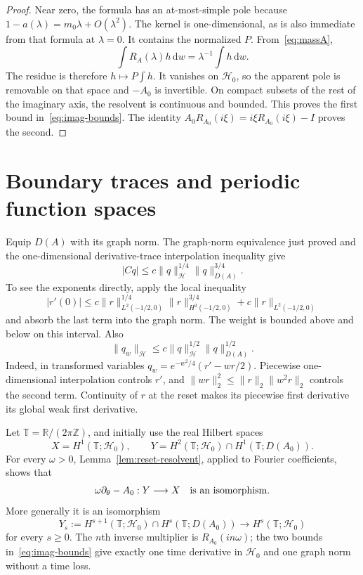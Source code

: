 \documentclass[11pt,a4paper]{article}
\numberwithin{equation}{section}
\theoremstyle{remark}\newtheorem{remark}[theorem]{Remark}
\newcommand{\R}{\mathbb R}\newcommand{\C}{\mathbb C}\newcommand{\T}{\mathbb T}
\newcommand{\HH}{\mathcal H}\newcommand{\DD}{\mathcal D}
\newcommand{\dd}{\,\mathrm d}
\begin{document}
\begin{proof}
Near zero, the formula has an at-most-simple pole because $1-a(\lambda)=m_0\lambda+O(\lambda^2)$. The kernel is one-dimensional, as is also immediate from that formula at $\lambda=0$. It contains the normalized $P$. From~\eqref{eq:massA},
\[
 \int R_A(\lambda)h\dd w=\lambda^{-1}\int h\dd w.
\]
The residue is therefore $h\mapsto P\int h$. It vanishes on $\HH_0$, so the apparent pole is removable on that space and $-A_0$ is invertible. On compact subsets of the rest of the imaginary axis, the resolvent is continuous and bounded. This proves the first bound in~\eqref{eq:imag-bounds}. The identity $A_0R_{A_0}(i\xi)=i\xi R_{A_0}(i\xi)-I$ proves the second.
\end{proof}

\section{Boundary traces and periodic function spaces}
Equip $D(A)$ with its graph norm. The graph-norm equivalence just proved and the one-dimensional derivative-trace interpolation inequality give
\begin{equation}\label{eq:trace-interpolation}
 |Cq|\leq c\|q\|_\HH^{1/4}\|q\|_{D(A)}^{3/4}.
\end{equation}
To see the exponents directly, apply the local inequality
\[
 |r'(0)|\leq c\|r\|_{L^2(-1/2,0)}^{1/4}
                  \|r\|_{H^2(-1/2,0)}^{3/4}
             +c\|r\|_{L^2(-1/2,0)}
\]
and absorb the last term into the graph norm. The weight is bounded above and below on this interval. Also
\begin{equation}\label{eq:derivative-interpolation}
 \|q_w\|_\HH\leq
 c\|q\|_\HH^{1/2}\|q\|_{D(A)}^{1/2}.
\end{equation}
Indeed, in transformed variables $q_w=e^{-w^2/4}(r'-wr/2)$. Piecewise one-dimensional interpolation controls $r'$, and
$\|wr\|_2^2\leq\|r\|_2\|w^2r\|_2$ controls the second term. Continuity of $r$ at the reset makes its piecewise first derivative its global weak first derivative.

Let $\T=\R/(2\pi\mathbb Z)$, and initially use the real Hilbert spaces
\begin{equation}\label{eq:XY}
 X=H^1(\T;\HH_0),\qquad
 Y=H^2(\T;\HH_0)\cap H^1(\T;D(A_0)).
\end{equation}
For every $\omega>0$, Lemma~\ref{lem:reset-resolvent}, applied to Fourier coefficients, shows that
\begin{equation}\label{eq:periodiciso}
 \omega\partial_\theta-A_0:Y\longrightarrow X
 \quad\hbox{is an isomorphism}.
\end{equation}
More generally it is an isomorphism
\[
 Y_s:=H^{s+1}(\T;\HH_0)\cap H^s(\T;D(A_0))
 \longrightarrow H^s(\T;\HH_0)
\]
for every $s\geq0$. The $n$th inverse multiplier is $R_{A_0}(in\omega)$; the two bounds in~\eqref{eq:imag-bounds} give exactly one time derivative in $\HH_0$ and one graph norm without a time loss.
\end{document}
